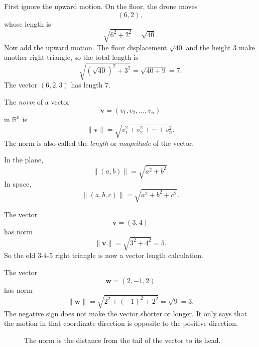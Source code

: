 First ignore the upward motion.  On the floor, the drone moves
\[
    (6,2),
\]
whose length is
\[
    \sqrt{6^2+2^2}=\sqrt{40}.
\]
Now add the upward motion.  The floor displacement \(\sqrt{40}\) and the height \(3\)
make another right triangle, so the total length is
\[
    \sqrt{(\sqrt{40})^2+3^2}
    =
    \sqrt{40+9}
    =
    7.
\]
The vector \((6,2,3)\) has length \(7\).

\begin{definition}[Norm]
The \emph{norm} of a vector
\[
    \mathbf v=(v_1,v_2,\ldots,v_n)
\]
in \(\mathbb R^n\) is
\[
    \|\mathbf v\|
    =
    \sqrt{v_1^2+v_2^2+\cdots+v_n^2}.
\]
The norm is also called the \emph{length} or \emph{magnitude} of the vector.
\end{definition}

In the plane,
\[
    \|(a,b)\|=\sqrt{a^2+b^2}.
\]
In space,
\[
    \|(a,b,c)\|=\sqrt{a^2+b^2+c^2}.
\]

\begin{example}
The vector
\[
    \mathbf v=(3,4)
\]
has norm
\[
    \|\mathbf v\|=\sqrt{3^2+4^2}=5.
\]
So the old \(3\)-\(4\)-\(5\) right triangle is now a vector length calculation.
\end{example}

\begin{example}
The vector
\[
    \mathbf w=(2,-1,2)
\]
has norm
\[
    \|\mathbf w\|
    =
    \sqrt{2^2+(-1)^2+2^2}
    =
    \sqrt{9}
    =
    3.
\]
The negative sign does not make the vector shorter or longer.  It only says that the
motion in that coordinate direction is opposite to the positive direction.
\end{example}

\begin{figure}[h]
\centering
{}
\caption{The norm is the distance from the tail of the vector to its head.}
\end{figure}

